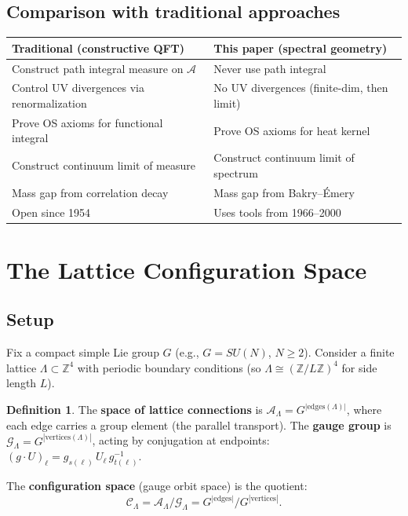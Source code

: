 \documentclass[11pt]{article}
\theoremstyle{definition}
\newtheorem{definition}[theorem]{Definition}
\newcommand{\calA}{\mathcal{A}}
\newcommand{\calG}{\mathcal{G}}
\newcommand{\calC}{\mathcal{C}}
\newcommand{\Z}{\mathbb{Z}}
\begin{document}
\subsection{Comparison with traditional approaches}

\begin{center}
\renewcommand{\arraystretch}{1.3}
\begin{tabular}{@{} p{5.5cm} p{5.5cm} @{}}
\hline
\textbf{Traditional (constructive QFT)} & \textbf{This paper (spectral geometry)} \\
\hline
Construct path integral measure on $\calA$ &
    Never use path integral \\
Control UV divergences via renormalization &
    No UV divergences (finite-dim, then limit) \\
Prove OS axioms for functional integral &
    Prove OS axioms for heat kernel \\
Construct continuum limit of measure &
    Construct continuum limit of spectrum \\
Mass gap from correlation decay &
    Mass gap from Bakry--\'Emery \\
Open since 1954 &
    Uses tools from 1966--2000 \\
\hline
\end{tabular}
\end{center}


\section{The Lattice Configuration Space}
\label{sec:lattice}

\subsection{Setup}

Fix a compact simple Lie group $G$ (e.g., $G = SU(N)$, $N \geq 2$). Consider a finite lattice $\Lambda \subset \Z^4$ with periodic boundary conditions (so $\Lambda \cong (\Z/L\Z)^4$ for side length $L$).

\begin{definition}
The \textbf{space of lattice connections} is $\calA_\Lambda = G^{|\text{edges}(\Lambda)|}$, where each edge carries a group element (the parallel transport). The \textbf{gauge group} is $\calG_\Lambda = G^{|\text{vertices}(\Lambda)|}$, acting by conjugation at endpoints: $(g \cdot U)_\ell = g_{s(\ell)}\, U_\ell\, g_{t(\ell)}^{-1}$.

The \textbf{configuration space} (gauge orbit space) is the quotient:
\begin{equation}
    \calC_\Lambda = \calA_\Lambda / \calG_\Lambda = G^{|\text{edges}|} / G^{|\text{vertices}|}.
\end{equation}
\end{definition}
\end{document}
